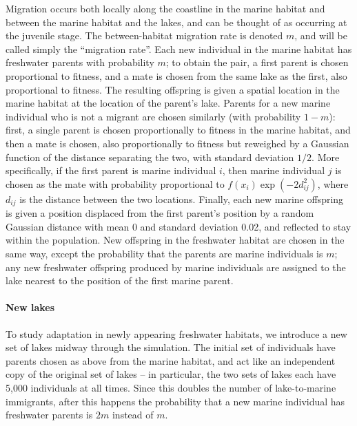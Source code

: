 \documentclass{article}
\begin{document}
Migration occurs both locally along the coastline in the marine habitat
and between the marine habitat and the lakes,
and can be thought of as occurring at the juvenile stage.
The between-habitat migration rate is denoted $m$,
and will be called simply the ``migration rate''.
Each new individual in the marine habitat has freshwater parents with probability $m$;
to obtain the pair, a first parent is chosen proportional to fitness,
and a mate is chosen from the same lake as the first, also proportional to fitness.
The resulting offspring is given a spatial location in the marine habitat
at the location of the parent's lake.
Parents for a new marine individual who is not a migrant are chosen similarly (with probability $1-m$):
first, a single parent is chosen proportionally to fitness in the marine habitat,
and then a mate is chosen, 
also proportionally to fitness but reweighed by a Gaussian function 
of the distance separating the two, with standard deviation $1/2$. 
More specifically, if the first parent is marine individual $i$,
then marine individual $j$ is chosen as the mate
with probability proportional to $f(x_i) \exp(-2d_{ij}^2)$,
where $d_{ij}$ is the distance between the two locations.
Finally, each new marine offspring is given a position 
displaced from the first parent's position by a random Gaussian distance
with mean 0 and standard deviation 0.02, and reflected to stay within the population.
New offspring in the freshwater habitat are chosen in the same way,
except the probability that the parents are marine individuals is $m$;
any new freshwater offspring produced by marine individuals
are assigned to the lake nearest to the position of the first marine parent.

\paragraph{New lakes}
To study adaptation in newly appearing freshwater habitats,
we introduce a new set of lakes midway through the simulation.
The initial set of individuals have parents chosen as above from the marine habitat,
and act like an independent copy of the original set of lakes -- in particular,
the two sets of lakes each have 5,000 individuals at all times.
Since this doubles the number of lake-to-marine immigrants,
after this happens the probability that a new marine individual has freshwater parents
is $2m$ instead of $m$.
\end{document}
